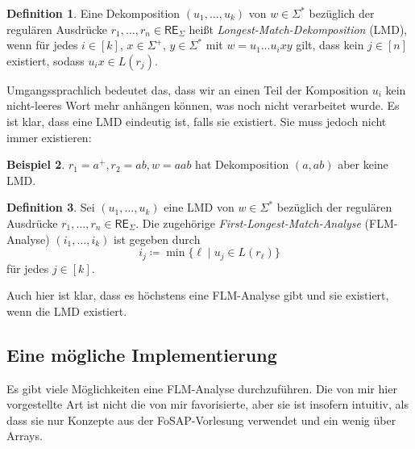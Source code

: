\documentclass[11pt, a4paper]{article}
\theoremstyle{definition}
\newtheorem{definition}{Definition}
\newtheorem{example}[definition]{Beispiel}
\theoremstyle{plain}
\begin{document}
\begin{definition}
	Eine Dekomposition \( (u_1, \ldots, u_k) \) von \( w \in \Sigma^\ast \) bezüglich der regulären Ausdrücke \( r_1, \ldots, r_n \in \mathsf{RE}_\Sigma \) heißt \textit{Longest-Match-Dekomposition} (LMD), wenn für jedes \( i \in [k] \), \( x \in \Sigma^+ \), \( y \in \Sigma^\ast \) mit \( w = u_1 \ldots u_i x y \) gilt, dass kein \( j \in [n] \) existiert, sodass \( u_i x \in L(r_j) \). 
\end{definition}
Umgangssprachlich bedeutet das, dass wir an einen Teil der Komposition \( u_i \) kein nicht-leeres Wort mehr anhängen können, was noch nicht verarbeitet wurde.
Es ist klar, dass eine LMD eindeutig ist, falls sie existiert. Sie muss jedoch nicht immer existieren:

\begin{example}
	\( r_1 = a^+, r_2 = ab, w = aab \) hat Dekomposition \( (a, ab) \) aber keine LMD.
\end{example}

\begin{definition}
	Sei \( (u_1, \ldots, u_k) \) eine LMD von \( w \in \Sigma^\ast \) bezüglich der regulären Ausdrücke \( r_1, \ldots, r_n \in \mathsf{RE}_\Sigma \). Die zugehörige \textit{First-Longest-Match-Analyse} (FLM-Analyse) \( (i_1, \ldots, i_k) \) ist gegeben durch
	\[
		i_j \coloneqq \min \{ \ell \mid u_j \in L(r_\ell) \}
	\]
	für jedes \( j \in [k] \).
\end{definition}
Auch hier ist klar, dass es höchstens eine FLM-Analyse gibt und sie existiert, wenn die LMD existiert.


\subsection*{Eine mögliche Implementierung}
Es gibt viele Möglichkeiten eine FLM-Analyse durchzuführen. Die von mir hier vorgestellte Art ist nicht die von mir favorisierte, aber sie ist insofern intuitiv, als dass sie nur Konzepte aus der FoSAP-Vorlesung verwendet und ein wenig über Arrays.
\end{document}
